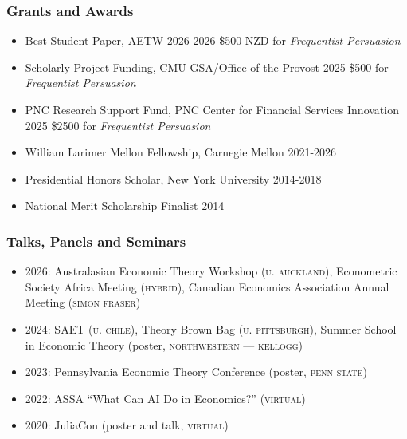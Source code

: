 \documentclass[12pt]{article}   %
\begin{document}
\subsubsection*{Grants and Awards}
\begin{itemize}
  \item Best Student Paper, AETW 2026 \hfill 2026 
  \subitem \$500 NZD for \textit{Frequentist Persuasion}
  \item Scholarly Project Funding, CMU GSA/Office of the Provost \hfill 2025 
  \subitem \$500 for \textit{Frequentist Persuasion}
  \item PNC Research Support Fund, PNC Center for Financial Services Innovation \hfill 2025 
  \subitem \$2500 for \emph{Frequentist Persuasion}
  \item William Larimer Mellon Fellowship, Carnegie Mellon \hfill 2021-2026
  \item Presidential Honors Scholar, New York University \hfill 2014-2018
  \item National Merit Scholarship Finalist \hfill 2014
\end{itemize}

\subsubsection*{Talks, Panels and Seminars}


\begin{itemize}
  \item 2026: Australasian Economic Theory Workshop (\textsc{u. auckland}), Econometric Society Africa Meeting (\textsc{hybrid}), Canadian Economics Association Annual Meeting (\textsc{simon fraser})
  \item 2024: SAET (\textsc{u. chile}), Theory Brown Bag (\textsc{u. pittsburgh}), Summer School in Economic Theory (poster, \textsc{northwestern --- kellogg})
  \item 2023: Pennsylvania Economic Theory Conference (poster, \textsc{penn state})
  \item 2022: ASSA ``What Can AI Do in Economics?'' (\textsc{virtual})
  \item 2020: JuliaCon (poster and talk, \textsc{virtual})
\end{itemize}
\end{document}
